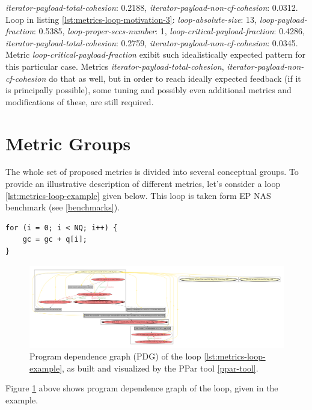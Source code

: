 \textit{iterator-payload-total-cohesion}: 0.2188,
\textit{iterator-payload-non-cf-cohesion}: 0.0312.\newline
\null\qquad Loop in listing \ref{lst:metrics-loop-motivation-3}: \textit{loop-absolute-size}: 13, \textit{loop-payload-fraction}: 0.5385, \textit{loop-proper-sccs-number}: 1, \textit{loop-critical-payload-fraction}: 0.4286,
\textit{iterator-payload-total-cohesion}: 0.2759,
\textit{iterator-payload-non-cf-cohesion}: 0.0345.\newline
\null\qquad Metric \textit{loop-critical-payload-fraction} exibit such idealistically expected pattern for this particular case. Metrics \textit{iterator-payload-total-cohesion}, \textit{iterator-payload-non-cf-cohesion} do that as well, but in order to reach ideally expected feedback (if it is principally possible), some tuning and possibly even additional metrics and modifications of these, are still required.

\section{Metric Groups}
\label{metrics-metric-groups}
\qquad The whole set of proposed metrics is divided into several conceptual groups. To provide an illustrative description of different metrics, let's consider a loop \ref{lst:metrics-loop-example} given below. This loop is taken form EP NAS benchmark (see \ref{benchmarks}).
\begin{lstlisting}[caption={Example loop, taken from EP NAS benchmark}, captionpos=b, label=lst:metrics-loop-example]
for (i = 0; i < NQ; i++) {
	gc = gc + q[i];
}
\end{lstlisting}
\begin{figure}[htb]
	\centering
	\includegraphics[width=\linewidth]{figs/metrics-example-loop-pdg.pdf}
	\caption{Program dependence graph (PDG) of the loop \ref{lst:metrics-loop-example}, as built and visualized by the PPar tool \ref{ppar-tool}.}
	\label{metrics-loop-example-pdg}
\end{figure}
\null\qquad Figure \ref{metrics-loop-example-pdg} above shows program dependence graph of the loop, given in the example. 

